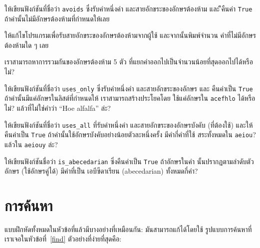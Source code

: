 \begin{exercise} 

ให้เขียนฟังก์ชันที่ชื่อว่า {\tt avoids} ซึ่งรับคำหนึ่งคำ และสายอักขระของอักษรต้องห้าม และ
ึิคืนค่า {\tt True} ถ้าคำนั้นไม่มีอักษรต้องห้ามที่กำหนดให้เลย

ให้แก้ไขโปรแกรมเพื่อรับสายอักขระของอักษรต้องห้ามจากผู้ใช้ และจากนั้นพิมพ์จำนวน
คำที่ไม่มีอักษรต้องห้ามใด ๆ เลย

เราสามารถหาการรวมกันของอักษรต้องห้าม 5 ตัว ที่แยกคำออกไปเป็นจำนวนน้อยที่สุดออกไปได้หรือไม่?

\end{exercise}



\begin{exercise}

ให้เขียนฟังก์ชันที่ชื่อว่า \verb"uses_only" ซึ่งรับคำหนึ่งคำ และสายอักขระของอักษร และ
คืนค่าเป็น {\tt True} ถ้าคำนั้นมีแค่อักษรในลิสต์ที่กำหนดให้  เราสามารถสร้างประโยคโดย
ใช้แค่อักษรใน {\tt acefhlo} ได้หรือไม่? แล้วที่ไม่ใช่คำว่า ``Hoe alfalfa'' ล่ะ?

\end{exercise}


\begin{exercise} 

ให้เขียนฟังก์ชันที่ชื่อว่า \verb"uses_all" ที่รับคำหนึ่งคำ และสายอักขระของอักษรบังคับ (ที่ต้องใช้)
และให้คืนค่าเป็น {\tt True} ถ้าคำนั้นใช้อักษรบังคับอย่างน้อยตัวละหนึ่งครั้ง  มีคำกี่คำที่ใช้
สระทั้งหมดใน {\tt aeiou}? แล้วใน {\tt aeiouy} ล่ะ?

\end{exercise}


\begin{exercise}

ให้เขียนฟังก์ชันชื่อว่า \verb"is_abecedarian" ซึ่งคืนค่าเป็น {\tt True} ถ้าอักษรในคำ
นั้นปรากฏตามลำดับตัวอักษร (ใช้อักษรคู่ได้)
มีคำที่เป็น เอบีซีดาเรียน (abecedarian) ทั้งหมดกี่คำ?

\end{exercise}



\section{การค้นหา} %
\label{search}

แบบฝึกหัดทั้งหมดในหัวข้อที่แล้วมีบางอย่างที่เหมือนกัน: มันสามารถแก้ได้โดยใช้
รูปแบบการค้นหาที่เราเจอในหัวข้อที่~\ref{find} ตัวอย่างที่ง่ายที่สุดคือ:


